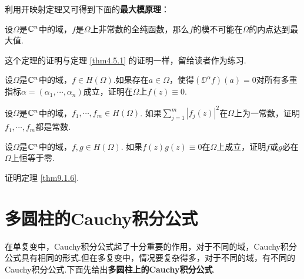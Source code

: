 利用开映射定理又可得到下面的\textbf{最大模原理}：
\begin{theorem}\label{thm9.1.6}
  设$\Omega$是$\mathbb C^n$中的域，$f$是$\Omega$上非常数的全纯函数，那么$f$的模不可能在$\Omega$的内点达到最大值.
\end{theorem}

这个定理的证明与定理 \ref{thm4.5.1} 的证明一样，留给读者作为练习.
\begin{xiti}
  \item 设$\Omega$是$\mathbb C^n$中的域，$f\in H(\Omega)$.如果存在$a\in\Omega$，使得$(\DD^\alpha f)(a)=0$对所有多重指标$\alpha=(\alpha_1,\cdots,\alpha_n)$成立，证明在$\Omega$上$f(z)\equiv0$.
  \item 设$\Omega$是$\mathbb C^n$中的域，$f_1,\cdots,f_m\in H(\Omega)$. 如果$\sum_{j=1}^m|f_j(z)|^2$在$\Omega$上为一常数，证明$f_1,\cdots,f_m$都是常数.
  \item 设$\Omega$是$\mathbb C^n$中的域，$f,g\in H(\Omega)$. 如果$f(z)g(z)\equiv0$在$\Omega$上成立，证明$f$或$g$必在$\Omega$上恒等于零.
  \item 证明定理 \ref{thm9.1.6}.
\end{xiti}

\section{多圆柱的Cauchy积分公式\label{sec9.2}}

在单复变中，Cauchy积分公式起了十分重要的作用，对于不同的域，Cauchy积分公式具有相同的形式.但在多复变中，情况要复杂得多，对于不同的域，有不同的Cauchy积分公式.下面先给出\textbf{多圆柱上的Cauchy积分公式}.

